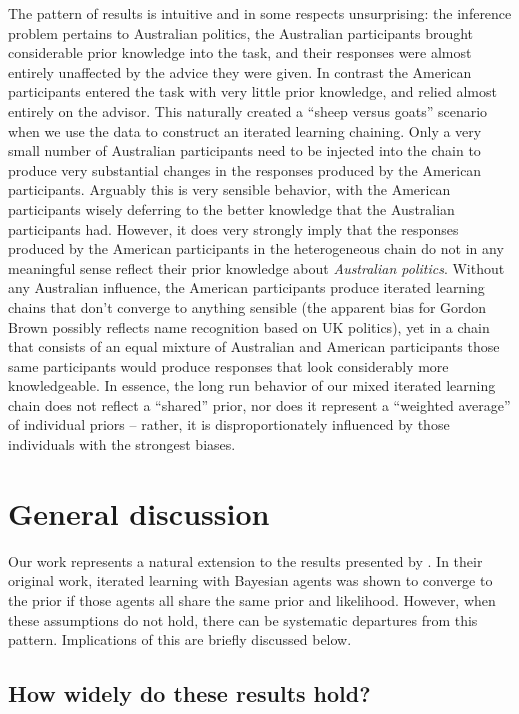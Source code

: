 \documentclass[doc]{apa6}
\begin{document}
The pattern of results is intuitive and in some respects unsurprising: the inference problem pertains to Australian politics, the Australian participants brought considerable prior knowledge into the task, and their responses were almost entirely unaffected by the advice they were given. In contrast the American participants entered the task with very little prior knowledge, and relied almost entirely on the advisor. This naturally created a ``{\sc sheep} versus {\sc goats}'' scenario when we use the data to construct an iterated learning chaining. Only a very small number of Australian participants need to be injected into the chain to produce very substantial changes in the responses produced by the American participants. Arguably this is very sensible behavior, with the American participants wisely deferring to the better knowledge that the Australian participants had. However, it does very strongly imply that the responses produced by the American participants in the heterogeneous chain do not in any meaningful sense reflect their prior knowledge about {\it Australian politics}. Without any Australian influence, the American participants produce iterated learning chains that don't converge to anything sensible (the apparent bias for Gordon Brown possibly reflects name recognition based on UK politics), yet in a chain that consists of an equal mixture of Australian and American participants those same participants would produce responses that look considerably more knowledgeable. In essence, the long run behavior of our mixed iterated learning chain does not reflect a ``shared'' prior, nor does it represent a ``weighted average'' of individual priors -- rather, it is disproportionately influenced by those individuals with the strongest biases. 



\section{General discussion}

Our work represents a natural extension to the  results presented by \textcite{griffiths_language_2007}. In their original work, iterated learning with Bayesian agents was shown to converge to the prior if those agents all share the same prior and likelihood. However, when these assumptions do not hold, there can be systematic departures from this pattern. Implications of this are briefly discussed below.

\subsection{How widely do these results hold?}
\end{document}
